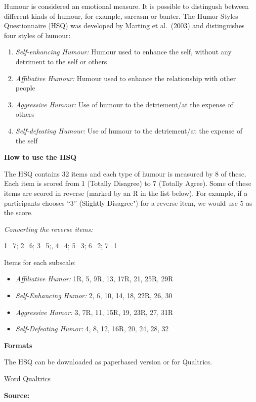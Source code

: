 \documentclass[
]{book}
\providecommand{\tightlist}{%
  \setlength{\itemsep}{0pt}\setlength{\parskip}{0pt}}
\begin{document}
Humour is considered an emotional measure. It is possible to distingush between different kinds of humour, for example, sarcasm or banter. The Humor Styles Questionnaire (HSQ) was developed by Marting et al.~(2003) and distinguishes four styles of humour:

\begin{enumerate}
\def\labelenumi{\arabic{enumi}.}
\tightlist
\item
  \emph{Self-enhancing Humour:} Humour used to enhance the self, without any detriment to the self or others
\item
  \emph{Affiliative Humour:} Humour used to enhance the relationship with other people
\item
  \emph{Aggressive Humour:} Use of humour to the detriement/at the expense of others
\item
  \emph{Self-defeating Humour:} Use of humour to the detriement/at the expense of the self
\end{enumerate}

\textbf{How to use the HSQ}

The HSQ contains 32 items and each type of humour is measured by 8 of these. Each item is scored from 1 (Totally Disagree) to 7 (Totally Agree). Some of these items are scored in reverse (marked by an R in the list below). For example, if a participants chooses ``3'' (Slightly Disagree") for a reverse item, we would use 5 as the score.

\emph{Converting the reverse items:}

1=7; 2=6; 3=5;, 4=4; 5=3; 6=2; 7=1

Items for each subscale:

\begin{itemize}
\tightlist
\item
  \emph{Affiliative Humor:} 1R, 5, 9R, 13, 17R, 21, 25R, 29R
\item
  \emph{Self-Enhancing Humor:} 2, 6, 10, 14, 18, 22R, 26, 30
\item
  \emph{Aggressive Humor:} 3, 7R, 11, 15R, 19, 23R, 27, 31R
\item
  \emph{Self-Defeating Humor:} 4, 8, 12, 16R, 20, 24, 28, 32
\end{itemize}

\textbf{Formats}

The HSQ can be downloaded as paperbased version or for Qualtrics.

\href{link\%20to\%20file}{Word} \textbar{} \href{link\%20to\%20file}{Qualtrics}

\textbf{Source:}
\end{document}
